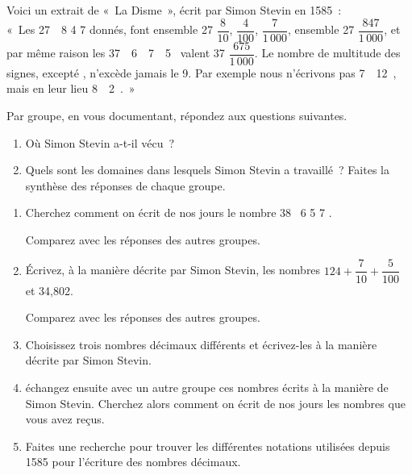 
\begin{TP}[]
Voici un extrait de « La Disme », écrit par Simon Stevin en 1585 : \\[0.3em]

« Les 27  8  4  7  donnés, font ensemble 27 $\dfrac{8}{10}$, $\dfrac{4}{100}$, $\dfrac{7}{1\,000}$, ensemble 27 $\dfrac{847}{1\,000}$, et par même raison les 37  6  7  5  valent 37 $\dfrac{675}{1\,000}$. Le nombre de multitude des signes, excepté , n'excède jamais le 9. Par exemple nous n'écrivons pas 7  12 , mais en leur lieu 8  2 . »


Par groupe, en vous documentant, répondez aux questions suivantes.
\begin{enumerate}
 \item Où Simon Stevin a-t-il vécu ?
 \item Quels sont les domaines dans lesquels Simon Stevin a travaillé ? Faites la synthèse des réponses de chaque groupe.
 \end{enumerate}
 

\begin{enumerate}
\item Cherchez comment on écrit de nos jours le nombre 38  6  5  7 .

Comparez avec les réponses des autres groupes.

\item Écrivez, à la manière décrite par Simon Stevin, les nombres $124 + \dfrac{7}{10} + \dfrac{5}{100}$ et 34,802.

Comparez avec les réponses des autres groupes.

 \item Choisissez trois nombres décimaux différents et écrivez-les à la manière décrite par Simon Stevin.
 \item échangez ensuite avec un autre groupe ces nombres écrits à la manière de Simon Stevin. Cherchez alors comment on écrit de nos jours les nombres que vous avez reçus.
 \item Faites une recherche pour trouver les différentes notations utilisées depuis 1585 pour l'écriture des nombres décimaux.
 \end{enumerate}
\end{TP}


